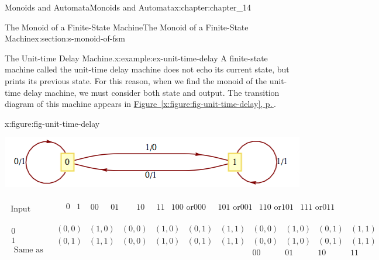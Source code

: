\documentclass[twoside,10pt,]{book}
\newcommand{\xreffont}{\relax}
\numberwithin{equation}{section}
\begin{document}
\begin{chapterptx}{Monoids and Automata}{}{Monoids and Automata}{}{}{x:chapter:chapter_14}
\begin{sectionptx}{The Monoid of a Finite-State Machine}{}{The Monoid of a Finite-State Machine}{}{}{x:section:s-monoid-of-fsm}
\begin{example}{The Unit-time Delay Machine.}{x:example:ex-unit-time-delay}%
A finite-state machine called the unit-time delay machine does not echo its current state, but prints its previous state. For this reason, when we find the monoid of the unit-time delay machine, we must consider both state and output. The transition diagram of this machine appears in \hyperref[x:figure:fig-unit-time-delay]{Figure~{\xreffont\ref{x:figure:fig-unit-time-delay}}, p.\,\pageref{x:figure:fig-unit-time-delay}}.%
\begin{figureptx}{}{x:figure:fig-unit-time-delay}{}%
\begin{image}{0.15}{0.7}{0.15}%
\includegraphics[width=\linewidth]{images/fig-unit-time-delay.png}
\end{image}%
\tcblower
\end{figureptx}%
\(\begin{array}{c|c}
\textrm{ Input} & 
\begin{array}{cccccccccc}
& 
\begin{array}{cc}
0 & 1 \\
\end{array}
& 00\textrm{          } & 01\textrm{       } & \textrm{       }10\textrm{        } & 11 & 100\textrm{ or}000\textrm{ 
} & 101\textrm{ or}001 & 110\textrm{ or}101 & 111\textrm{ or}011 \\
\end{array}
\\
\hline
\begin{array}{c}
0 \\
1 \\
\textrm{ Same} \textrm{ as} \\
\end{array}
& 
\begin{array}{cccccccccc}
(0,0) & (1,0) & (0,0) & (1,0) & (0,1) & (1,1) & (0,0) & (1,0) & (0,1) & (1,1) \\
(0,1) & (1,1) & (0,0) & (1,0) & (0,1) & (1,1) & (0,0) & (1,0) & (0,1) & (1,1) \\
&   &   &   &   &   & 00 & 01 & 10 & 11 \\
\end{array}
\\
\end{array}\)%

\end{example}
\end{sectionptx}
\end{chapterptx}
\end{document}
